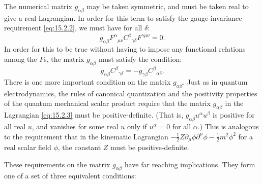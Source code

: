 The numerical matrix $g_{\alpha\beta}$ may be taken symmetric, and must be taken
real to give a real Lagrangian. In order for this term to satisfy the
gauge-invariance requirement \eqref{eq:15.2.2}, we must have for all $\delta$:
\[
 g_{\alpha\beta}F^\alpha{}_{\mu\nu}C^\beta{}_{\gamma\delta}
 F^{\gamma\mu\nu}=0 .
\]
In order for this to be true without having to impose any functional relations
among the $F$s, the matrix $g_{\alpha\beta}$ must satisfy the condition:
\begin{equation}
 g_{\alpha\beta}C^\beta{}_{\gamma\delta}
 =-g_{\gamma\beta}C^\beta{}_{\alpha\delta} .
 \tag{15.2.4}\label{eq:15.2.4}
\end{equation}
There is one more important condition on the matrix $g_{\alpha\beta}$. Just as in
quantum electrodynamics, the rules of canonical quantization and the positivity
properties of the quantum mechanical scalar product require that the matrix
$g_{\alpha\beta}$ in the Lagrangian \eqref{eq:15.2.3} must be positive-definite.
(That is, $g_{\alpha\beta}u^\alpha u^\beta$ is positive for all real $u$, and
vanishes for some real $u$ only if $u^\alpha=0$ for all $\alpha$.) This is
analogous to the requirement that in the kinematic Lagrangian
$-\frac12Z\partial_\mu\phi\partial^\mu\phi-\frac12m^2\phi^2$ for a real scalar
field $\phi$, the constant $Z$ must be positive-definite.

These requirements on the matrix $g_{\alpha\beta}$ have far reaching
implications. They form one of a set of three equivalent conditions:

